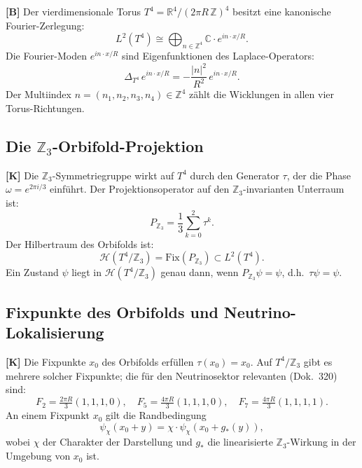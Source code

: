 \textbf{[B]} Der vierdimensionale Torus
$T^4 = \mathbb{R}^4/(2\pi R\,\mathbb{Z})^4$
besitzt eine kanonische Fourier-Zerlegung:
\begin{equation}
  L^2(T^4) \cong \bigoplus_{n \in \mathbb{Z}^4}
  \mathbb{C} \cdot e^{in\cdot x/R}.
  \label{eq:FourierT4}
\end{equation}
Die Fourier-Moden $e^{in\cdot x/R}$ sind Eigenfunktionen des
Laplace-Operators:
\begin{equation}
  \Delta_{T^4}\, e^{in\cdot x/R}
  = -\frac{|n|^2}{R^2}\, e^{in\cdot x/R}.
  \label{eq:Laplace}
\end{equation}
Der Multiindex $n = (n_1, n_2, n_3, n_4) \in \mathbb{Z}^4$ zählt
die Wicklungen in allen vier Torus-Richtungen.

\subsection{Die $\mathbb{Z}_3$-Orbifold-Projektion}

\textbf{[K]} Die $\mathbb{Z}_3$-Symmetriegruppe wirkt auf $T^4$ durch
den Generator $\tau$, der die Phase $\omega = e^{2\pi i/3}$ einführt.
Der Projektionsoperator auf den $\mathbb{Z}_3$-invarianten Unterraum
ist:
\begin{equation}
  P_{\mathbb{Z}_3} = \frac{1}{3}\sum_{k=0}^{2} \tau^k.
  \label{eq:PZ3}
\end{equation}
Der Hilbertraum des Orbifolds ist:
\begin{equation}
  \mathcal{H}(T^4/\mathbb{Z}_3) = \mathrm{Fix}(P_{\mathbb{Z}_3})
  \subset L^2(T^4).
  \label{eq:Horb}
\end{equation}
Ein Zustand $\psi$ liegt in $\mathcal{H}(T^4/\mathbb{Z}_3)$ genau dann,
wenn $P_{\mathbb{Z}_3}\psi = \psi$, d.h.\ $\tau\psi = \psi$.

\subsection{Fixpunkte des Orbifolds und Neutrino-Lokalisierung}

\textbf{[K]} Die Fixpunkte $x_0$ des Orbifolds erfüllen
$\tau(x_0) = x_0$. Auf $T^4/\mathbb{Z}_3$ gibt es mehrere solcher
Fixpunkte; die für den Neutrinosektor relevanten (Dok.~320) sind:
\begin{equation}
  F_2 = \tfrac{2\pi R}{3}(1,1,1,0),\quad
  F_5 = \tfrac{4\pi R}{3}(1,1,1,0),\quad
  F_7 = \tfrac{4\pi R}{3}(1,1,1,1).
  \label{eq:fixpunkte}
\end{equation}
An einem Fixpunkt $x_0$ gilt die Randbedingung
\begin{equation}
  \psi_\chi(x_0 + y) = \chi \cdot \psi_\chi(x_0 + g_*(y)),
  \label{eq:rbd}
\end{equation}
wobei $\chi$ der Charakter der Darstellung und $g_*$ die
linearisierte $\mathbb{Z}_3$-Wirkung in der Umgebung von $x_0$ ist.

